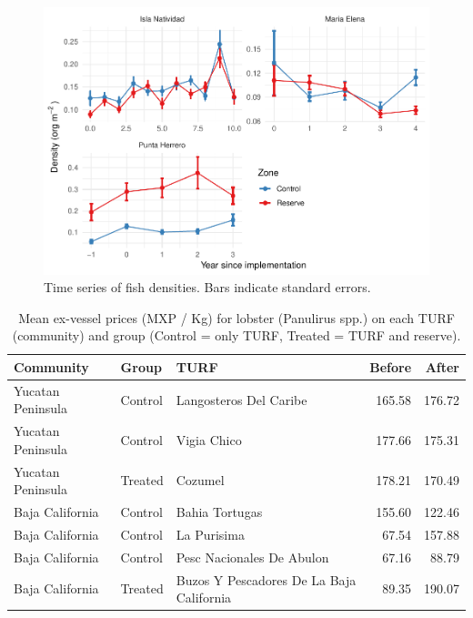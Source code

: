 \documentclass[utf8]{frontiers_suppmat} %
\begin{document}
\clearpage

\begin{figure}
\centering
\includegraphics{SupplementaryMaterial_files/figure-latex/unnamed-chunk-7-1.pdf}
\caption{\label{fig:unnamed-chunk-7}Time series of fish densities. Bars indicate standard errors.}
\end{figure}

\clearpage

\begin{table}[t]

\caption{\label{tab:unnamed-chunk-8}Mean ex-vessel prices (MXP / Kg) for lobster (Panulirus spp.) on each TURF (community) and group (Control = only TURF, Treated = TURF and reserve).}
\centering
\begin{tabular}{lllrr}
\toprule
Community & Group & TURF & Before & After\\
\midrule
Yucatan Peninsula & Control & Langosteros Del Caribe & 165.58 & 176.72\\
Yucatan Peninsula & Control & Vigia Chico & 177.66 & 175.31\\
Yucatan Peninsula & Treated & Cozumel & 178.21 & 170.49\\
Baja California & Control & Bahia Tortugas & 155.60 & 122.46\\
Baja California & Control & La Purisima & 67.54 & 157.88\\
\addlinespace
Baja California & Control & Pesc Nacionales De Abulon & 67.16 & 88.79\\
Baja California & Treated & Buzos Y Pescadores De La Baja California & 89.35 & 190.07\\
\bottomrule
\end{tabular}
\end{table}
\end{document}
